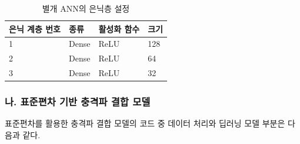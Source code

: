 \documentclass[11pt]{report}
\begin{document}
\begin{table}[H]
	\begin{center}
	\vspace{0.5cm}
	\begin{tabular}{@{}llll@{}}
		\toprule
		은닉 계층 번호 & 종류    & 활성화 함수 & 크기  \\ \midrule
		1        & Dense & ReLU   & 128 \\
		2        & Dense & ReLU   & 64  \\
		3        & Dense & ReLU   & 32  \\ \bottomrule
		\end{tabular}
	\end{center}
	\caption{별개 ANN의 은닉층 설정}
	\label{tab:hid_set}
\end{table}

\subsubsection*{나. 표준편차 기반 충격파 결합 모델}
표준편차를 활용한 충격파 결합 모델의 코드 중 데이터 처리와 딥러닝 모델 부분은 다음과 같다. 
\end{document}
